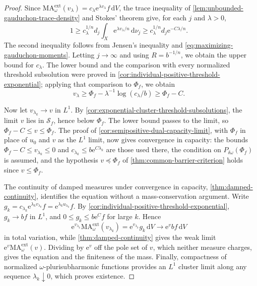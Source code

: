 \begin{proof}
Since $\mathrm{MA}^{\mathrm{ext}}_\omega(v_\lambda)=c_\lambda\mathrm{e}^{\lambda v_\lambda}f\,\mathrm{d}V$, the trace inequality of \cref{lem:unbounded-gauduchon-trace-density} and Stokes' theorem give, for each $j$ and $\lambda>0$,
\[
 1\geq c_\lambda^{1/n}d_j
              \int_X\mathrm{e}^{\lambda v_\lambda/n}\,\mathrm{d}\nu_j
   \geq c_\lambda^{1/n}d_j\mathrm{e}^{-C\lambda/n}.
\]
The second inequality follows from Jensen's inequality and \eqref{eq:maximizing-gauduchon-moments}. Letting $j\to\infty$ and using $R=b^{-1/n}$, we obtain the upper bound for $c_\lambda$. The lower bound and the comparison with every normalized threshold subsolution were proved in \cref{cor:individual-positive-threshold-exponential}; applying that comparison to $\Phi_f$, we obtain
\[
 v_\lambda\geq\Phi_f-\lambda^{-1}\log(c_\lambda/b)
                \geq\Phi_f-C.
\]

Now let $v_{\lambda_k}\to v$ in $L^1$. By \cref{cor:exponential-cluster-threshold-subsolutions}, the limit $v$ lies in $\mathcal S_f$, hence below $\Phi_f$. The lower bound passes to the limit, so $\Phi_f-C\leq v\leq\Phi_f$. The proof of \cref{cor:semipositive-dual-capacity-limit}, with $\Phi_f$ in place of $u_0$ and $v$ as the $L^1$ limit, now gives convergence in capacity: the bounds $\Phi_f-C\leq v_{\lambda_k}\leq0$ and $c_{\lambda_k}\leq b\mathrm{e}^{C\lambda_k}$ are those used there, the condition on $P_{\delta\omega}(\Phi_f)$ is assumed, and the hypothesis $v\preceq\Phi_f$ of \cref{thm:common-barrier-criterion} holds since $v\leq\Phi_f$.

The continuity of damped measures under convergence in capacity, \cref{thm:damped-continuity}, identifies the equation without a mass-conservation argument. Write $g_k=c_{\lambda_k}\mathrm{e}^{\lambda_k v_{\lambda_k}}f=\mathrm{e}^{\lambda_ku_{\lambda_k}}f$. By \cref{cor:individual-positive-threshold-exponential}, $g_k\to bf$ in $L^1$, and $0\leq g_k\leq b\mathrm{e}^Cf$ for large $k$. Hence
\[
 \mathrm{e}^{v_{\lambda_k}}\mathrm{MA}^{\mathrm{ext}}_\omega(v_{\lambda_k})
   =\mathrm{e}^{v_{\lambda_k}}g_k\,\mathrm{d}V
   \longrightarrow\mathrm{e}^v bf\,\mathrm{d}V
\]
in total variation, while \cref{thm:damped-continuity} gives the weak limit
$\mathrm{e}^v\mathrm{MA}^{\mathrm{ext}}_\omega(v)$. Dividing by $\mathrm{e}^v$ off the pole set of $v$, which neither measure charges, gives the equation and the finiteness of the mass. Finally, compactness of normalized $\omega$-plurisubharmonic functions provides an $L^1$ cluster limit along any sequence $\lambda_k\downarrow0$, which proves existence.
\end{proof}

